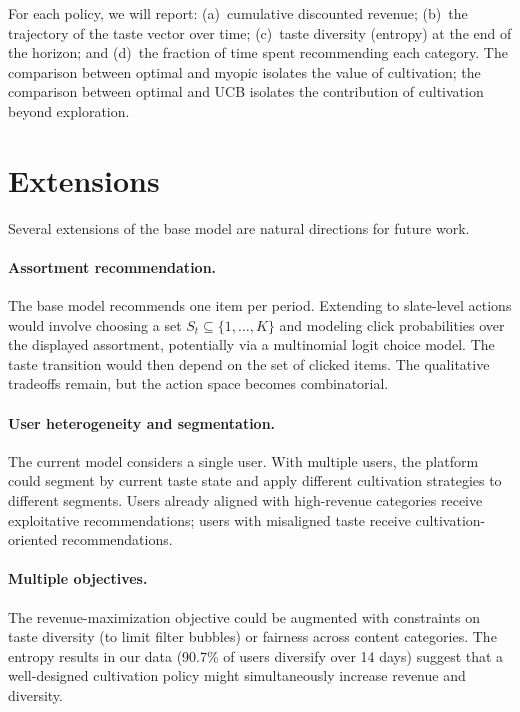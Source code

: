 \documentclass[11pt]{article}
\begin{document}
For each policy, we will report: (a)~cumulative discounted revenue; (b)~the trajectory of the taste vector over time; (c)~taste diversity (entropy) at the end of the horizon; and (d)~the fraction of time spent recommending each category. The comparison between optimal and myopic isolates the value of cultivation; the comparison between optimal and UCB isolates the contribution of cultivation beyond exploration.

\section{Extensions}
\label{sec:extensions}

Several extensions of the base model are natural directions for future work.

\paragraph{Assortment recommendation.} The base model recommends one item per period. Extending to slate-level actions would involve choosing a set $S_t \subseteq \{1, \ldots, K\}$ and modeling click probabilities over the displayed assortment, potentially via a multinomial logit choice model. The taste transition would then depend on the set of clicked items. The qualitative tradeoffs remain, but the action space becomes combinatorial.

\paragraph{User heterogeneity and segmentation.} The current model considers a single user. With multiple users, the platform could segment by current taste state and apply different cultivation strategies to different segments. Users already aligned with high-revenue categories receive exploitative recommendations; users with misaligned taste receive cultivation-oriented recommendations.

\paragraph{Multiple objectives.} The revenue-maximization objective could be augmented with constraints on taste diversity (to limit filter bubbles) or fairness across content categories. The entropy results in our data (90.7\% of users diversify over 14 days) suggest that a well-designed cultivation policy might simultaneously increase revenue and diversity.
\end{document}
